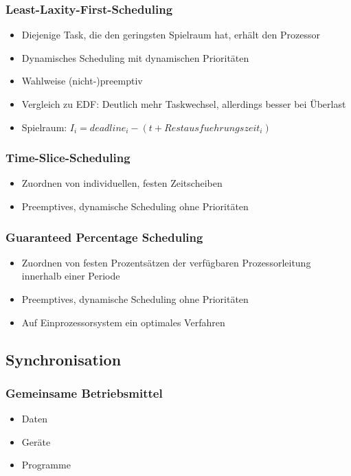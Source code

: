 \subsubsection{Least-Laxity-First-Scheduling}
\begin{itemize}
	\item Diejenige Task, die den geringsten Spielraum hat, erhält den Prozessor
	\item Dynamisches Scheduling mit dynamischen Prioritäten
	\item Wahlweise (nicht-)preemptiv
	\item Vergleich zu EDF: Deutlich mehr Taskwechsel, allerdings besser bei Überlast
	\item Spielraum: \(I_i = deadline_i -(t+Restausfuehrungszeit_i)\)
\end{itemize}

\subsubsection{Time-Slice-Scheduling}
\begin{itemize}
	\item Zuordnen von individuellen, festen Zeitscheiben
	\item Preemptives, dynamische Scheduling ohne Prioritäten
\end{itemize}

\subsubsection{Guaranteed Percentage Scheduling}
\begin{itemize}
	\item Zuordnen von festen Prozentsätzen der verfügbaren Prozessorleitung innerhalb einer Periode
	\item Preemptives, dynamische Scheduling ohne Prioritäten
	\item Auf Einprozessorsystem ein optimales Verfahren
\end{itemize}


\subsection{Synchronisation}

\subsubsection{Gemeinsame Betriebsmittel}
\begin{itemize}
	\item Daten
	\item Geräte
	\item Programme
\end{itemize}

